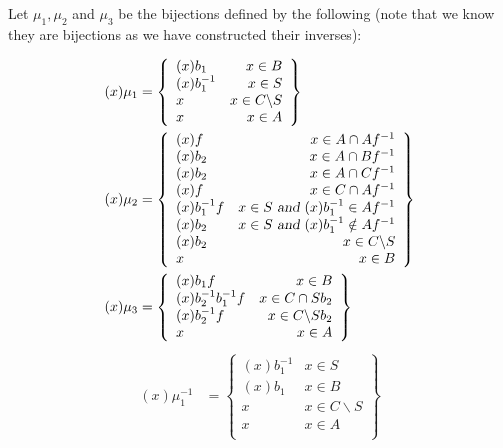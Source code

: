 \documentclass{report}
\begin{document}
Let $\mu_1,\mu_2$ and $\mu_3$ be the bijections defined by the following (note that we know they are bijections as we have constructed their inverses):
\begin{multicols}{2}
\begin{align*}
(x)\mu_1&=
 \left\{
    \begin{array}{lr}
      (x)b_1& x \in B \\
      (x)b_1^{-1}& x \in S \\
            x &  x \in C \backslash S\\      x & x \in A\\
    \end{array}
    \right\}\\
    (x)\mu_2&=
 \left\{
    \begin{array}{lr}
      (x)f&  x \in A\cap A f^{-1} \\
            (x)b_2&  x \in A\cap B f^{-1} \\
                  (x)b_2&  x \in A\cap C f^{-1} \\
      (x)f&  x \in C \cap Af^{-1} \\
      (x)b_1^{-1}f&  x \in S \textsl{ and } (x)b_1^{-1} \in Af^{-1} \\
      (x)b_2&  x \in S \textsl{ and } (x)b_1^{-1} \notin Af^{-1} \\
            (x)b_2&  x \in C \backslash  S  \\
      x&  x \in B
    \end{array}
    \right\}\\
(x)\mu_3&=
 \left\{
    \begin{array}{lr}
      (x)b_1f&  x \in B \\      
            (x)b_2^{-1}b_1^{-1}f& x \in C \cap Sb_2\\
                        (x)b_2^{-1}f& x \in C \backslash  Sb_2\\
      x& x \in A
    \end{array}
    \right\}
\end{align*}
\begin{align*}
(x)\mu_1^{-1}&=
 \left\{
    \begin{array}{lr}
      (x)b_1^{-1}& x \in S \\
      (x)b_1& x \in B \\
            x &  x \in C \backslash  S\\      x & x \in A\\
    \end{array}
    \right\}\\

\end{align*}
\end{multicols}
\end{document}
